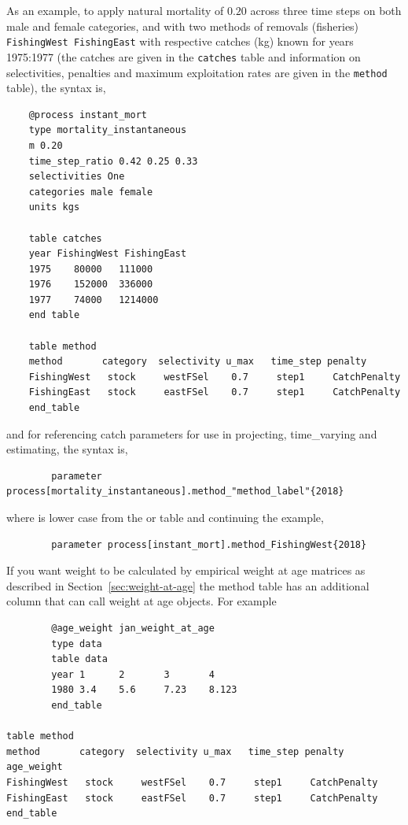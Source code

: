As an example, to apply natural mortality of $0.20$ across three time steps on both male and female categories, and with two methods of removals (fisheries) \texttt{FishingWest FishingEast} with respective catches (kg) known for years 1975:1977 (the catches are given in the \texttt{catches} table and information on selectivities, penalties and maximum exploitation rates are given in the \texttt{method} table), the syntax is,

{\small{\begin{verbatim}
	@process instant_mort
	type mortality_instantaneous
	m 0.20
	time_step_ratio 0.42 0.25 0.33
	selectivities One
	categories male female
	units kgs

	table catches
	year FishingWest FishingEast
	1975	80000	111000
	1976	152000	336000
	1977	74000	1214000
	end table

	table method
	method       category  selectivity u_max   time_step penalty
	FishingWest   stock     westFSel    0.7     step1     CatchPenalty
	FishingEast   stock     eastFSel    0.7     step1     CatchPenalty
	end_table
	\end{verbatim}}}

and for referencing catch parameters for use in projecting, time\_varying and estimating, the syntax is,
{\small{\begin{verbatim}
		parameter process[mortality_instantaneous].method_"method_label"{2018}
		\end{verbatim}}}
	where  is lower case from the  or  table and continuing the example,

{\small{\begin{verbatim}
		parameter process[instant_mort].method_FishingWest{2018}
		\end{verbatim}}}

If you want weight to be calculated by empirical weight at age matrices as described in Section~\ref{sec:weight-at-age} the method table has an additional column that can call weight at age objects. For example

{\small{\begin{verbatim}
		@age_weight jan_weight_at_age
		type data
		table data
		year 1 		2 		3 		4
		1980 3.4	5.6		7.23 	8.123
		end_table
		
table method
method       category  selectivity u_max   time_step penalty 		age_weight
FishingWest   stock     westFSel    0.7     step1     CatchPenalty
FishingEast   stock     eastFSel    0.7     step1     CatchPenalty
end_table		
\end{verbatim}}}


